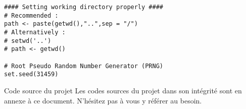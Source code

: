 \begin{lstlisting}[caption = Environnement de travail,label=src:wdSetting]
#### Setting working directory properly ####
# Recommended :
path <- paste(getwd(),"..",sep = "/")
# Alternatively :
# setwd('..')
# path <- getwd()

# Root Pseudo Random Number Generator (PRNG)
set.seed(31459)
\end{lstlisting} 

\begin{moreInfo}{Code source du projet}
	Les codes sources du projet dans son intégrité sont en annexe à ce document. N'hésitez pas à vous y référer au besoin.
\end{moreInfo}